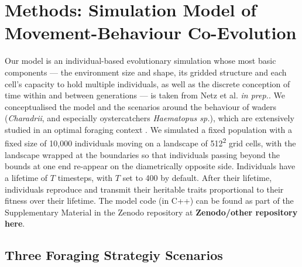 \documentclass[11pt]{article}
\begin{document}

\section{Methods: Simulation Model of Movement-Behaviour Co-Evolution}

Our model is an individual-based evolutionary simulation whose most basic components --- the environment size and shape, its gridded structure and each cell's capacity to hold multiple individuals, as well as the discrete conception of time within and between generations --- is taken from Netz et al. \textit{in prep.}.
We conceptualised the model and the scenarios around the behaviour of waders (\textit{Charadrii}, and especially oystercatchers \textit{Haematopus sp.}), which are extensively studied in an optimal foraging context \citep[e.g. ][]{vahl2005, vahl2005a, vahl2005b, ENS1990219}.
We simulated a fixed population with a fixed size of 10,000 individuals moving on a landscape of 512\textsuperscript{2} grid cells, with the landscape wrapped at the boundaries so that individuals passing beyond the bounds at one end re-appear on the diametrically opposite side.
Individuals have a lifetime of $T$ timesteps, with $T$ set to 400 by default.
After their lifetime, individuals reproduce and transmit their heritable traits proportional to their fitness over their lifetime.
The model code (in C++) can be found as part of the Supplementary Material in the Zenodo repository at \textbf{Zenodo/other repository here}.

\subsection{Three Foraging Strategiy Scenarios}
\end{document}
